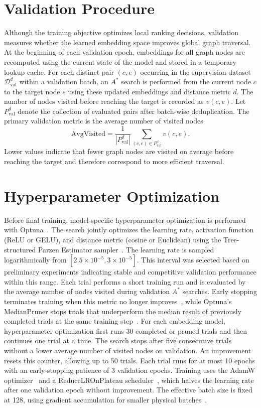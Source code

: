 \section{Validation Procedure}
\label{sec:train_validation}

Although the training objective optimizes local ranking decisions, validation measures whether the learned embedding space improves global graph traversal. At the beginning of each validation epoch, embeddings for all graph nodes are recomputed using the current state of the model and stored in a temporary lookup cache. For each distinct pair $(c,e)$ occurring in the supervision dataset $\mathcal{D}_{\mathrm{val}}^d$ within a validation batch, an $A^*$ search is performed from the current node $c$ to the target node $e$ using these updated embeddings and distance metric $d$. The number of nodes visited before reaching the target is recorded as $v(c,e)$. Let $P_{\mathrm{val}}^d$ denote the collection of evaluated pairs after batch-wise deduplication. The primary validation metric is the average number of visited nodes
$$
\text{AvgVisited}
=
\frac{1}{|P_{\mathrm{val}}^d|}
\sum_{(c,e)\in P_{\mathrm{val}}^d}
v(c,e).
$$
Lower values indicate that fewer graph nodes are visited on average before reaching the target and therefore correspond to more efficient traversal.


\section{Hyperparameter Optimization}
\label{sec:train_hyperparameters}

Before final training, model-specific hyperparameter optimization is performed with Optuna~\cite{akiba:2019}. The search jointly optimizes the learning rate, activation function (ReLU or GELU), and distance metric (cosine or Euclidean) using the Tree-structured Parzen Estimator sampler~\cite{bergstra:2011}. The learning rate is sampled logarithmically from $[2.5 \times 10^{-5}, 3 \times 10^{-5}]$. This interval was selected based on preliminary experiments indicating stable and competitive validation performance within this range. Each trial performs a short training run and is evaluated by the average number of nodes visited during validation $A^*$ searches. Early stopping terminates training when this metric no longer improves~\cite{prechelt:1998}, while Optuna's MedianPruner stops trials that underperform the median result of previously completed trials at the same training step~\cite{optuna:medianpruner}. For each embedding model, hyperparameter optimization first runs 30 completed or pruned trials and then continues one trial at a time. The search stops after five consecutive trials without a lower average number of visited nodes on validation. An improvement resets this counter, allowing up to 50 trials. Each trial runs for at most 10 epochs with an early-stopping patience of 3 validation epochs. Training uses the AdamW optimizer~\cite{loshchilov:2019} and a \mbox{ReduceLROnPlateau} scheduler~\cite{pytorch:reducelronplateau}, which halves the learning rate after one validation epoch without improvement. The effective batch size is fixed at 128, using gradient accumulation for smaller physical batches~\cite{ott:2018,lightning:gradientaccumulation}.


